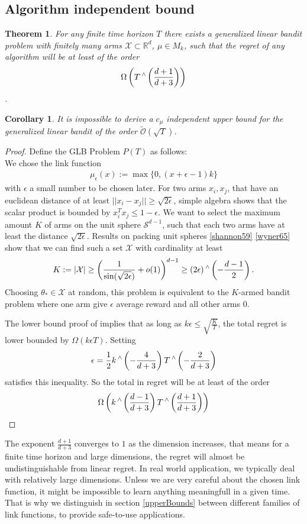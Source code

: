 \documentclass[twoside]{article} \usepackage{aistats2017}
\DeclareMathOperator\caret{\raisebox{1ex}{$\scriptstyle\wedge$}}
\newtheorem{theorem}{Theorem}
\newtheorem{corollary}{Corollary}[theorem]
\begin{document}
\subsection{Algorithm independent bound}
\begin{theorem}
For any finite time horizon $T$ there exists a generalized linear bandit problem with finitely many arms $\mathcal{X}\subset\mathbb{R}^d$, $\mu\in M_k$, such that the regret of any algorithm will be at least of the order
$$\Omega\left(T\caret\left(\frac{d+1}{d+3}\right)\right)$$.
\end{theorem}
\begin{corollary}
It is impossible to derive a $c_\mu$ independent upper bound for the generalized linear bandit of the order $\tilde{\mathcal{O}}(\sqrt{T})$.
\end{corollary}
\begin{proof}
    Define the GLB Problem $P(T)$ as follows:\\
    We chose the link function 
    \begin{align}
        \mu_\epsilon(x) := \max\{0, (x+\epsilon-1)k\}
    \end{align}
    with $\epsilon$ a small number to be chosen later. For two arms $x_i,x_j$, that have an euclidean distance of at least $||x_i-x_j||\geq\sqrt{2\epsilon}$, simple algebra shows that the scalar product is bounded by $x_i^Tx_j \leq 1-\epsilon$. We want to select the maximum amount $K$ of arms on the unit sphere $\mathcal{S}^{d-1}$, such that each two arms have at least the distance $\sqrt{2\epsilon}$. Results on packing
     unit spheres \ref{shannon59} \ref{wyner65} show that we can find such a set $\mathcal{X}$ with cardinality at least
     $$K:=|\mathcal{X}| \geq \left(\frac{1}{\sin(\sqrt{2\epsilon})}+o(1)\right)^{d-1}\geq (2\epsilon)\caret\left(-\frac{d-1}{2}\right).$$
     Choosing $\theta_*\in \mathcal{X}$ at random, this problem is equivalent to the $K$-armed bandit problem where one arm give $\epsilon$ average reward and all other arms $0$.
     
     The lower bound proof of \cite{Auer} implies that as long as $k\epsilon\leq \sqrt{\frac{K}{T}}$, the total regret is lower bounded by $\Omega(k\epsilon T)$. Setting
     $$\epsilon = \frac{1}{2}k\caret\left(-\frac{4}{d+3}\right)T\caret\left(-\frac{2}{d+3}\right)$$
     satisfies this inequality. So the total in regret will be at least of the order
     $$\Omega \left(k\caret\left(\frac{d-1}{d+3}\right)T\caret\left(\frac{d+1}{d+3}\right)\right)$$
    
\end{proof}
The exponent $\frac{d+1}{d+3}$ converges to $1$ as the dimension increases, that means for a finite time horizon and large dimensions, the regret will almost be undistinguishable from linear regret. 
In real world application, we typically deal with relatively large dimensions. 
Unless we are very careful about the chosen link function, it might be impossible to learn anything meaningfull in a given time.
That is why we distinguish in section \ref{upperBounds} between different families of link functions, to provide safe-to-use applications.
\end{document}
